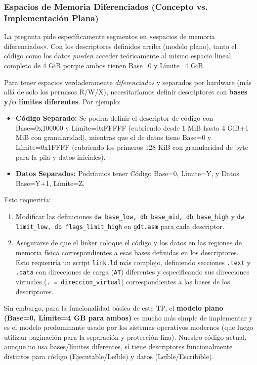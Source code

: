 \subsubsection{Espacios de Memoria Diferenciados (Concepto vs. Implementación Plana)}

La pregunta pide específicamente segmentos en «espacios de memoria diferenciados». Con los descriptores definidos arriba (modelo plano), tanto el código como los datos \textit{pueden} acceder teóricamente al mismo espacio lineal completo de 4 GiB porque ambos tienen Base=0 y Límite=4 GiB.

Para tener espacios verdaderamente \textit{diferenciados} y separados por hardware (más allá de solo los permisos R/W/X), necesitaríamos definir descriptores con \textbf{bases y/o límites diferentes}. Por ejemplo:

\begin{itemize}
    \item \textbf{Código Separado:} Se podría definir el descriptor de código con Base=0x100000 y Límite=0xFFFFF (cubriendo desde 1 MiB hasta 4 GiB+1 MiB con granularidad), mientras que el de datos tiene Base=0 y Límite=0x1FFFF (cubriendo los primeros 128 KiB con granularidad de byte para la pila y datos iniciales).
    \item \textbf{Datos Separados:} Podríamos tener Código Base=0, Límite=Y, y Datos Base=Y+1, Límite=Z.
\end{itemize}

Esto requeriría:
\begin{enumerate}
    \item Modificar las definiciones \texttt{dw base\_low, db base\_mid, db base\_high} y \texttt{dw limit\_low, db flags\_limit\_high} en \texttt{gdt.asm} para cada descriptor.
    \item Asegurarse de que el linker coloque el código y los datos en las regiones de memoria física correspondientes a esas bases definidas en los descriptores. Esto requeriría un script \texttt{link.ld} más complejo, definiendo secciones \texttt{.text} y \texttt{.data} con direcciones de carga (\texttt{AT}) diferentes y especificando sus direcciones virtuales (\texttt{. = direccion\_virtual}) correspondientes a las bases de los descriptores.
\end{enumerate}

Sin embargo, para la funcionalidad básica de este TP, el \textbf{modelo plano (Base=0, Límite=4 GB para ambos)} es mucho más simple de implementar y es el modelo predominante usado por los sistemas operativos modernos (que luego utilizan paginación para la separación y protección fina). Nuestro código actual, aunque no usa bases/límites diferentes, sí tiene descriptores funcionalmente distintos para código (Ejecutable/Leíble) y datos (Leíble/Escribible).

